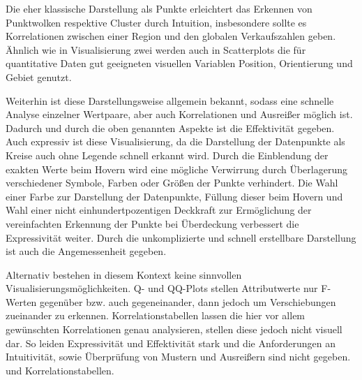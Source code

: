 \documentclass[usegeometry=true]{scrartcl}
\begin{document}
Die eher klassische Darstellung als Punkte erleichtert das Erkennen von Punktwolken respektive Cluster durch Intuition, insbesondere sollte es Korrelationen zwischen einer Region und den globalen Verkaufszahlen geben. 
Ähnlich wie in Visualisierung zwei werden auch in Scatterplots die für quantitative Daten gut geeigneten visuellen Variablen Position, Orientierung und Gebiet genutzt. %

Weiterhin ist diese Darstellungsweise allgemein bekannt, sodass eine schnelle Analyse einzelner Wertpaare, aber auch Korrelationen und Ausreißer möglich ist. 
Dadurch und durch die oben genannten Aspekte ist die Effektivität gegeben. 
Auch expressiv ist diese Visualisierung, da die Darstellung der Datenpunkte als Kreise auch ohne Legende schnell erkannt wird. 
Durch die Einblendung der exakten Werte beim Hovern wird eine mögliche Verwirrung durch Überlagerung verschiedener Symbole, Farben oder Größen der Punkte verhindert. 
Die Wahl einer Farbe zur Darstellung der Datenpunkte, Füllung dieser beim Hovern und Wahl einer nicht einhundertpozentigen Deckkraft zur Ermöglichung der vereinfachten Erkennung der Punkte bei Überdeckung verbessert die Expressivität weiter. 
Durch die unkomplizierte und schnell erstellbare Darstellung ist auch die Angemessenheit gegeben. 

Alternativ bestehen in diesem Kontext keine sinnvollen Visualisierungsmöglichkeiten.
Q- und QQ-Plots stellen Attributwerte nur F-Werten gegenüber bzw. auch gegeneinander, dann jedoch um Verschiebungen zueinander zu erkennen. 
Korrelationstabellen lassen die hier vor allem gewünschten Korrelationen genau analysieren, stellen diese jedoch nicht visuell dar.
So leiden Expressivität und Effektivität stark und die Anforderungen an Intuitivität, sowie Überprüfung von Mustern und Ausreißern sind nicht gegeben. 
und Korrelationstabellen. 
\end{document}
